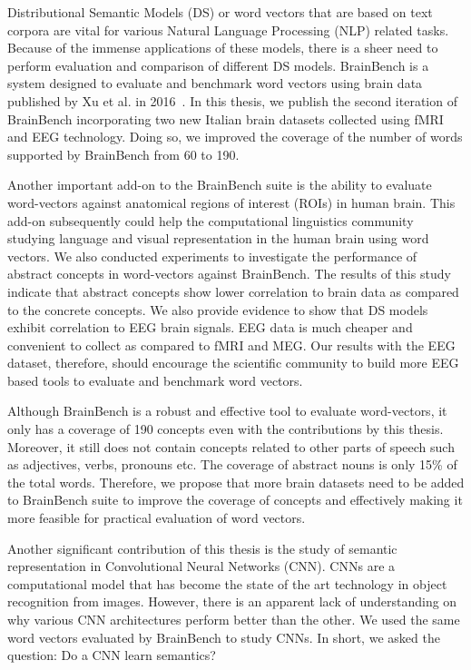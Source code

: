 \label{concl}

Distributional Semantic Models (DS) or word vectors that are based on text corpora are vital for various Natural Language Processing (NLP) related tasks. Because of the immense applications of these models, there is a sheer need to perform evaluation and comparison of different DS models. BrainBench is a system designed to evaluate and benchmark word vectors using brain data published by Xu et al. in 2016~\cite{BrainBench2016}. In this thesis, we publish the second iteration of BrainBench incorporating two new Italian brain datasets collected using fMRI and EEG technology. Doing so, we improved the coverage of the number of words supported by BrainBench from 60 to 190. 

Another important add-on to the BrainBench suite is the ability to evaluate word-vectors against anatomical regions of interest (ROIs) in human brain. This add-on subsequently could help the computational linguistics community studying language and visual representation in the human brain using word vectors. We also conducted experiments to investigate the performance of abstract concepts in word-vectors against BrainBench. The results of this study indicate that abstract concepts show lower correlation to brain data as compared to the concrete concepts. We also provide evidence to show that DS models exhibit correlation to EEG brain signals. EEG data is much cheaper and convenient to collect as compared to fMRI and MEG. Our results with the EEG dataset, therefore, should encourage the scientific community to build more EEG based tools to evaluate and benchmark word vectors.

Although BrainBench is a robust and effective tool to evaluate word-vectors, it only has a coverage of 190 concepts even with the contributions by this thesis. Moreover, it still does not contain concepts related to other parts of speech such as adjectives, verbs, pronouns etc. The coverage of abstract nouns is only 15\% of the total words. Therefore, we propose that more brain datasets need to be added to BrainBench suite to improve the coverage of concepts and effectively making it more feasible for practical evaluation of word vectors.

Another significant contribution of this thesis is the study of semantic representation in Convolutional Neural Networks (CNN). CNNs are a computational model that has become the state of the art technology in object recognition from images. However, there is an apparent lack of understanding on why various CNN architectures perform better than the other.  We used the same word vectors evaluated by BrainBench to study CNNs. In short, we asked the question: Do a CNN learn semantics?

